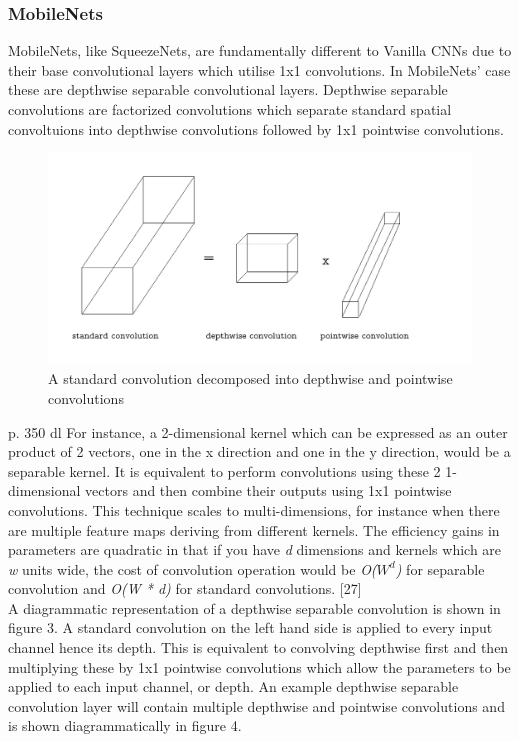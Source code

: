 \documentclass{article}
\begin{document}
\subsubsection{MobileNets}

MobileNets, like SqueezeNets, are fundamentally different to Vanilla CNNs due to their base convolutional layers which utilise 1x1 convolutions. In MobileNets' case these are depthwise separable convolutional layers. Depthwise separable convolutions are factorized convolutions which separate standard spatial convoltuions into depthwise convolutions followed by 1x1 pointwise convolutions.\\

\begin{figure}[!b]
  \includegraphics[width=\linewidth]{separableconv.pdf}
  \caption{A standard convolution decomposed into depthwise and pointwise convolutions}
  \label{fig:dwconvolution}
\end{figure}

p. 350 dl
For instance, a 2-dimensional kernel which can be expressed as an outer product of 2 vectors, one in the x direction and one in the y direction, would be a separable kernel. It is equivalent to perform convolutions using these 2 1-dimensional vectors and then combine their outputs using 1x1 pointwise convolutions. This technique scales to multi-dimensions, for instance when there are multiple feature maps deriving from different kernels. The efficiency gains in parameters are quadratic in that if you have \emph{d} dimensions and kernels which are \emph{w} units wide, the cost of convolution operation would be \emph{O($W^d$)} for separable convolution and \emph{O(W * d)} for standard convolutions. [27] \\

A diagrammatic representation of a depthwise separable convolution is shown in figure 3. A standard convolution on the left hand side is applied to every input channel hence its depth. This is equivalent to convolving depthwise first and then multiplying these by 1x1 pointwise convolutions which allow the parameters to be applied to each input channel, or depth. An example depthwise separable convolution layer will contain multiple depthwise and pointwise convolutions and is shown diagrammatically in figure 4.\\
\end{document}
